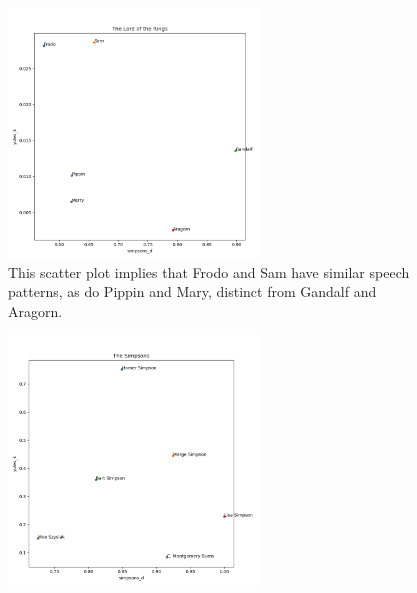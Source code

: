 \documentclass{article}
\newcommand{\mediumimagewidth}{250}
\begin{document}
\begin{titlepage}
\begin{figure}[H]
\centering
\includegraphics[width=\mediumimagewidth]{images/The Lord of the Rings_heuristics.png}
\caption{This scatter plot implies that Frodo and Sam have similar speech patterns, as do Pippin and Mary, distinct from Gandalf and Aragorn.}
\end{figure}

\begin{figure}[H]
\centering
\includegraphics[width=\mediumimagewidth]{images/The Simpsons_heuristics.png}
\end{figure}


\end{titlepage}
\end{document}

